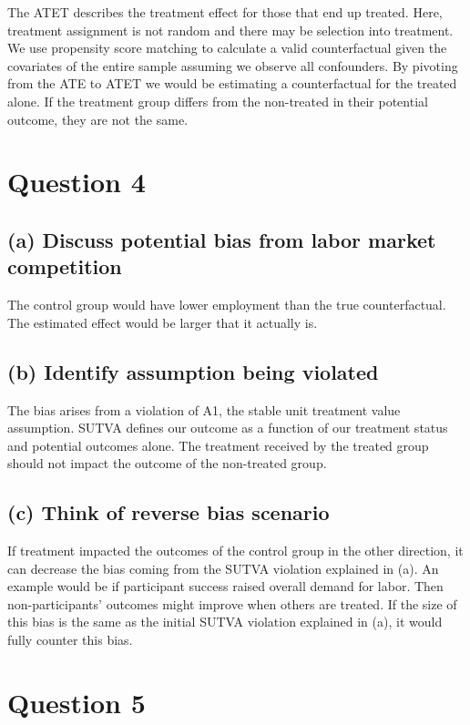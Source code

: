 \documentclass{scrartcl}
\begin{document}
The ATET describes the treatment effect for those that end up treated. Here, treatment assignment is not random and there may be selection into treatment. We use propensity score matching to calculate a valid counterfactual given the covariates of the entire sample assuming we observe all confounders. By pivoting from the ATE to ATET we would be estimating a counterfactual for the treated alone. If the treatment group differs from the non-treated in their potential outcome, they are not the same.

\section*{Question 4}

\subsection*{(a) Discuss potential bias from labor market competition}

The control group would have lower employment than the true counterfactual. The estimated effect would be larger that it actually is. 

\subsection*{(b) Identify assumption being violated}

The bias arises from a violation of A1, the stable unit treatment value assumption. SUTVA defines our outcome as a function of our treatment status and potential outcomes alone. The treatment received by the treated group should not impact the outcome of the non-treated group.

\subsection*{(c) Think of reverse bias scenario}

If treatment impacted the outcomes of the control group in the other direction, it can decrease the bias coming from the SUTVA violation explained in (a). An example would be if participant success raised overall demand for labor. Then non-participants’ outcomes might improve when others are treated. If the size of this bias is the same as the initial SUTVA violation explained in (a), it would fully counter this bias.

\section*{Question 5}
\end{document}
